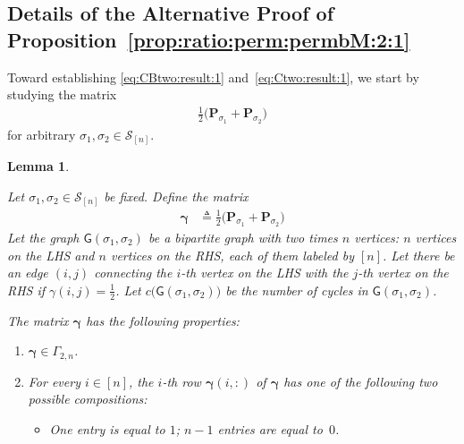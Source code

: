 \documentclass[journal,lettersize,twocolumn]{IEEEtran} %
\newtheorem{lemma}[theorem]{Lemma}
\newcommand{\vect}[1]{ \bm{#1} }
\newcommand{\set}[1]{\mathcal{#1}}
\newcommand{\vgam}{ \vect{\gamma} }
\newcommand{\matr}[1]{ \bm{#1} }
\newcommand{\defeq}{ \triangleq }
\newcommand{\setS}{\set{S}}
\newcommand{\mP}{\matr{P}}
\newcommand{\sfG}{\mathsf{G}}
\newcommand{\Gamtwon}{ \Gamma_{2,n} }
\begin{document}
\begin{appendices}
%

%
%

\ifx\withclearpagecommands\x
\clearpage
\fi

\section{Details of the Alternative Proof of 
               Proposition~\ref{prop:ratio:perm:permbM:2:1}}
\label{app:alt:proof:prop:ratio:perm:permbM:2:1}

%

\medskip

Toward establishing \eqref{eq:CBtwo:result:1} and~\eqref{eq:Ctwo:result:1}, we 
start by studying the matrix
\begin{align*}
  \frac{1}{2} 
  \bigl( 
  \mP_{\sigma_1} \! + \! \mP_{\sigma_2} 
  \bigr)
\end{align*}
for arbitrary $\sigma_1, \sigma_2 \in \setS_{[n]}$.

%

\begin{lemma}
  \label{lemma:vgam:graph:properties:1}

  Let $\sigma_1, \sigma_2 \in \setS_{[n]}$ be fixed. Define the matrix
  \begin{align*}
    \vgam
      &\defeq
         \frac{1}{2} 
         \bigl( 
           \mP_{\sigma_1} \! + \! \mP_{\sigma_2} 
          \bigr)
  \end{align*}
  Let the graph $\sfG(\sigma_1,\sigma_2)$ be a bipartite graph with two times
  $n$ vertices: $n$ vertices on the LHS and $n$ vertices on the RHS, each of
  them labeled by $[n]$. Let there be an edge $(i,j)$ connecting the $i$-th
  vertex on the LHS with the $j$-th vertex on the RHS if
  $\gamma(i,j) = \frac{1}{2}$. Let $c\bigl( \sfG(\sigma_1,\sigma_2) \bigr)$ be
  the number of cycles in $\sfG(\sigma_1,\sigma_2)$.

  The matrix $\vgam$ has the following properties:
  \begin{enumerate}
    
  \item $\vgam \in \Gamtwon$.

  \item For every $i \in [n]$, the $i$-th row $\vgam(i,:)$ of $\vgam$ has one
    of the following two possible compositions:
    \begin{itemize}
  
    \item One entry is equal to $1$; $n \! - \! 1$ entries are equal to~$0$.
  

\end{itemize}
\end{enumerate}
\end{lemma}
\end{appendices}
\end{document}
